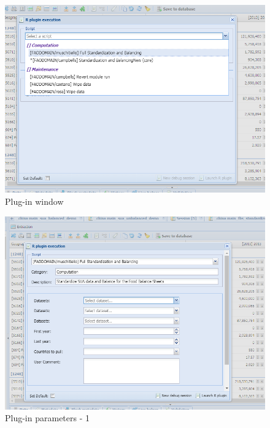 \documentclass[]{article}
\begin{document}
\begin{figure}[H]

{\centering \includegraphics[width=1\linewidth]{images/standPlugin/25_selectPlugin2} 

}

\caption{\label{fig:f26}Plug-in window}\label{fig:f26}
\end{figure}

\begin{figure}[H]

{\centering \includegraphics[width=1\linewidth]{images/standPlugin/26_parametersPI1} 

}

\caption{\label{fig:f27}Plug-in parameters - 1}\label{fig:f27}
\end{figure}
\end{document}
